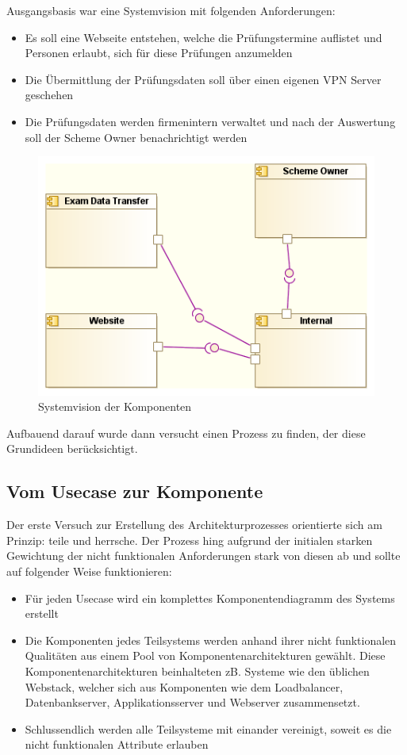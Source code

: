 Ausgangsbasis war eine Systemvision mit folgenden Anforderungen:

\begin{itemize}
  \item Es soll eine Webseite entstehen, welche die Prüfungstermine auflistet und Personen erlaubt, sich für diese Prüfungen anzumelden
  \item Die Übermittlung der Prüfungsdaten soll über einen eigenen VPN Server geschehen
  \item Die Prüfungsdaten werden firmenintern verwaltet und nach der Auswertung soll der Scheme Owner benachrichtigt werden
\end{itemize}

\begin{figure}[!htbp]
    \centering
    \includegraphics[scale=0.6]{uml/vision.png}
    \caption{Systemvision der Komponenten}
\end{figure}

Aufbauend darauf wurde dann versucht einen Prozess zu finden, der diese Grundideen berücksichtigt.

\subsection{Vom Usecase zur Komponente}
Der erste Versuch zur Erstellung des Architekturprozesses orientierte sich am Prinzip: teile und herrsche. Der Prozess hing aufgrund der initialen starken Gewichtung der nicht funktionalen Anforderungen stark von diesen ab und sollte auf folgender Weise funktionieren:

\begin{itemize}
  \item Für jeden Usecase wird ein komplettes Komponentendiagramm des Systems erstellt
  \item Die Komponenten jedes Teilsystems werden anhand ihrer nicht funktionalen Qualitäten aus einem Pool von Komponentenarchitekturen gewählt. Diese Komponentenarchitekturen beinhalteten zB. Systeme wie den üblichen Webstack, welcher sich aus Komponenten wie dem Loadbalancer, Datenbankserver, Applikationsserver und Webserver zusammensetzt.
  \item Schlussendlich werden alle Teilsysteme mit einander vereinigt, soweit es die nicht funktionalen Attribute erlauben
\end{itemize}

